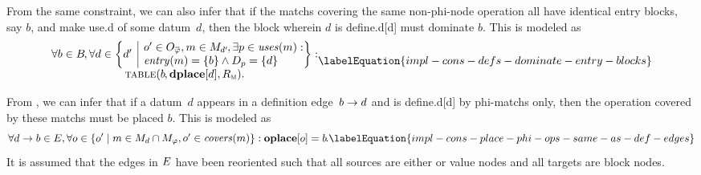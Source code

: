 From the same \gls{constraint}, we can also infer that if the \glspl{match}
covering the same non-\gls{phi-node} \gls{operation} all have identical
\glspl{entry block}, say $b$\hspace{-1pt}, and make \gls{use.d} of some
\gls{datum}~$d$\hspace{-1pt}, then the \gls{block} wherein $d$ is
\gls{define.d}[d] must dominate $b$\hspace{-1pt}.
%
This is modeled as
%
\begin{equation}
  \begin{array}{@{}c@{}}
    \forall b \in \mBlockSet \hspace{-1pt},
    \forall d \in
      \mSetBuilder*{d'}%
                   {%
                     \begin{array}{@{}l@{}}
                       o' \in \mOpCompSet{\mPhi},
                       m \in \mMatchSet[d'] \hspace{-1pt},
                       \exists p \in \mUses(m) : \\
                       \mEntry(m) = \mSet{b} \mAnd \mDataSet[p] = \mSet{d}
                     \end{array}
                   } : \\
    \mTable(b \hspace{-.8pt}, \mVar{dplace}[d], \mDomMatrix).
  \end{array}
  \labelEquation{impl-cons-defs-dominate-entry-blocks}
\end{equation}

From , we can infer that if a \gls{datum}~$d$ appears in
a \gls{definition edge}~$b \rightarrow d$ and is \gls{define.d}[d] by
\glspl{phi-match} only, then the \gls{operation} covered by these \glspl{match}
must be placed $b$.
%
This is modeled as
%
\begin{equation}
  \forall \mEdge{d}{b} \in \mFunctionDefEdgeSet,
  \forall o \in
    \mSetBuilder{o'}%
                {%
                  \begin{array}{@{}l@{}}
                    m \in \mMatchSet[d] \cap \mPhiMatchSet,
                    o' \in \mCovers(m)
                  \end{array}
                } :
  \mVar{oplace}[o] = b \hspace{-1pt}.
  \labelEquation{impl-cons-place-phi-ops-same-as-def-edges}
\end{equation}
%
It is assumed that the \glspl{edge} in $E$ have been
reoriented such that all \glspl{source} are either  or
\glspl{value node} and all \glspl{target} are \glspl{block node}.


